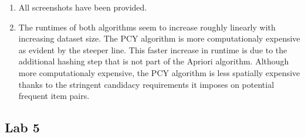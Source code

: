 \documentclass{article}
\begin{document}
\begin{enumerate}[label=\alph*., left=10pt, itemsep=10pt]
        \item \begin{minipage}[t]{0.9\textwidth}
            All screenshots have been provided.
        \end{minipage}
        
        \item \begin{minipage}[t]{0.9\textwidth}
            The runtimes of both algorithms seem to increase roughly linearly with increasing dataset size.
            The PCY algorithm is more computationaly expensive as evident by the steeper line. This faster
            increase in runtime is due to the additional hashing step that is not part of the Apriori algorithm.
            Although more computationaly expensive, the PCY algorithm is less spatially expensive
            thanks to the stringent candidacy requirements it imposes on potential frequent item pairs.
        \end{minipage}

    \end{enumerate}

    \subsection*{Lab 5} 
\end{document}
